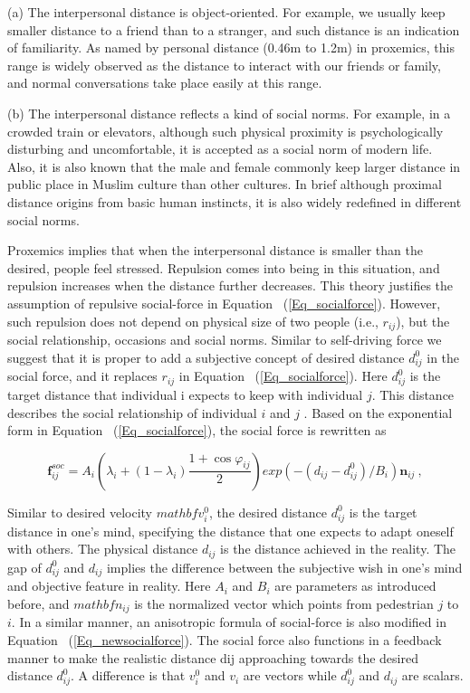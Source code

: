 \documentclass{article}
\begin{document}
\noindent (a)  The interpersonal distance is object-oriented. For example, we usually keep smaller distance to a friend than to a stranger, and such distance is an indication of familiarity.  As named by personal distance (0.46m to 1.2m) in proxemics, this range is widely observed as the distance to interact with our friends or family, and normal conversations take place easily at this range.

\noindent (b) The interpersonal distance reflects a kind of social norms.  For example, in a crowded train or elevators, although such physical proximity is psychologically disturbing and uncomfortable, it is accepted as a social norm of modern life.  Also, it is also known that the male and female commonly keep larger distance in public place in Muslim culture than other cultures.  In brief although proximal distance origins from basic human instincts, it is also widely redefined in different social norms.


Proxemics implies that when the interpersonal distance is smaller than the desired, people feel stressed.  Repulsion comes into being in this situation, and repulsion increases when the distance further decreases.  This theory justifies the assumption of repulsive social-force in Equation ~(\ref{Eq_socialforce}).  However, such repulsion does not depend on physical size of two people (i.e., $r_{ij}$), but the social relationship, occasions and social norms.  Similar to self-driving force we suggest that it is proper to add a subjective concept of desired distance $d_{ij}^0$ in the social force, and it replaces $r_{ij}$ in Equation ~(\ref{Eq_socialforce}).  Here $d_{ij}^0$ is the target distance that individual i expects to keep with individual $j$.  This distance describes the social relationship of individual $i$ and $j$ .  Based on the exponential form in Equation ~(\ref{Eq_socialforce}), the social force is rewritten as

%
\begin{equation}\label{Eq_newsocialforce}
 \mathbf{f}_{ij}^{soc} = A_i \left ( \lambda_i + (1-\lambda_i) \frac{1 + \cos \varphi_{ij}}{2} \right ) exp \left( -(d_{ij}-d_{ij}^0)/B_i \right) \mathbf{n}_{ij} ~,
\end{equation}
%

Similar to desired velocity $mathbf{v}_i^0$, the desired distance $d_{ij}^0$ is the target distance in one's mind, specifying the distance that one expects to adapt oneself with others.  The physical distance $d_{ij}$ is the distance achieved in the reality. The gap of $d_{ij}^0$ and $d_{ij}$ implies the difference between the subjective wish in one's mind and objective feature in reality. Here $A_i$ and $B_i$ are parameters as introduced before, and $mathbf{n}_{ij}$ is the normalized vector which points from pedestrian $j$ to $i$. In a similar manner, an anisotropic formula of social-force is also modified in Equation ~(\ref{Eq_newsocialforce}). The social force also functions in a feedback manner to make the realistic distance dij approaching towards the desired distance $d_{ij}^0$. A difference is that $v_i^0$ and $v_i$ are vectors while $d_{ij}^0$ and $d_{ij}$ are scalars.
\end{document}

